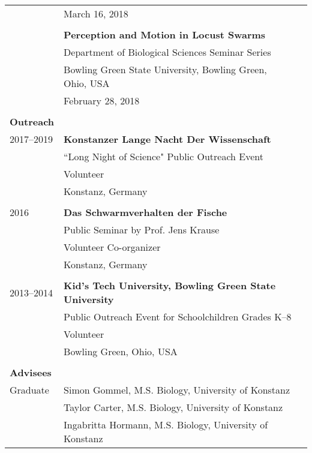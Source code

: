 \documentclass[letterpaper,6pt,oneside]{article}
\begin{document}
\begin{small}
\begin{longtable}{@{} l p{5.3in}l}
& March 16, 2018 \\
& \\
& \textbf{Perception and Motion in Locust Swarms} \\
& Department of Biological Sciences Seminar Series \\
& Bowling Green State University, Bowling Green, Ohio, USA \\
& February 28, 2018 \\
& \\
 \Large{\textbf{Outreach}}  \vspace{5mm} \\
\large{2017--2019}
& \textbf{Konstanzer Lange Nacht Der Wissenschaft} \\
& ``Long Night of Science" Public Outreach Event \\
& Volunteer \\
& Konstanz, Germany \\
& \\
\large{2016}
& \textbf{Das Schwarmverhalten der Fische} \\
& Public Seminar by Prof. Jens Krause \\
& Volunteer Co-organizer \\
& Konstanz, Germany \\
& \\
\large{2013–2014}
& \textbf{Kid's Tech University, Bowling Green State University} \\
& Public Outreach Event for Schoolchildren Grades K–8 \\
& Volunteer \\
& Bowling Green, Ohio, USA \\
& \\

 \Large{\textbf{Advisees}}  \vspace{5mm} \\
 \large{Graduate} 
 & Simon Gommel, M.S. Biology, University of Konstanz \\
 & Taylor Carter, M.S. Biology, University of Konstanz \\
 & Ingabritta Hormann, M.S. Biology, University of Konstanz \\


\end{longtable}
\end{small}
\end{document}
